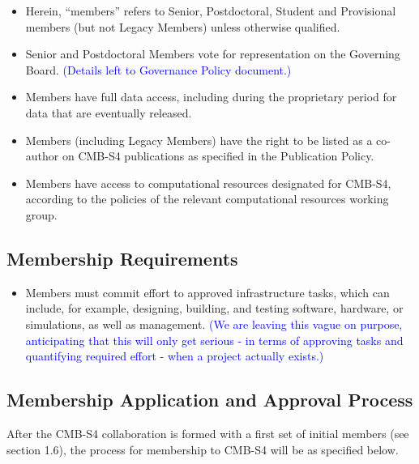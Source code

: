 \begin{itemize}
\item Herein, ``members'' refers to Senior, Postdoctoral, Student and Provisional members (but not Legacy Members) unless otherwise qualified.

\item Senior and Postdoctoral Members vote for representation on the Governing Board.  \textcolor{blue}{(Details left to Governance Policy document.)}

\item Members have full data access, including during the proprietary period for data that are eventually released.

\item Members (including Legacy Members) have the right to be listed as a co-author on CMB-S4 publications as specified in the Publication Policy.

\item Members have access to computational resources designated for CMB-S4, according to the policies of the relevant computational resources working group.

\end{itemize}

\subsection{Membership Requirements}
\begin{itemize}

\item Members must commit effort to approved infrastructure tasks, which can include, for example, designing, building, and testing software, hardware, or simulations, as well as management. 
\textcolor{blue}{(We are leaving this vague on purpose, anticipating that this will only get serious - in terms of approving tasks and quantifying required effort - when a project actually exists.)}  

\end{itemize}

\subsection{Membership Application and Approval Process}
After the CMB-S4 collaboration is formed with a first set of initial members (see section 1.6), the process for membership to CMB-S4 will be as specified below.

